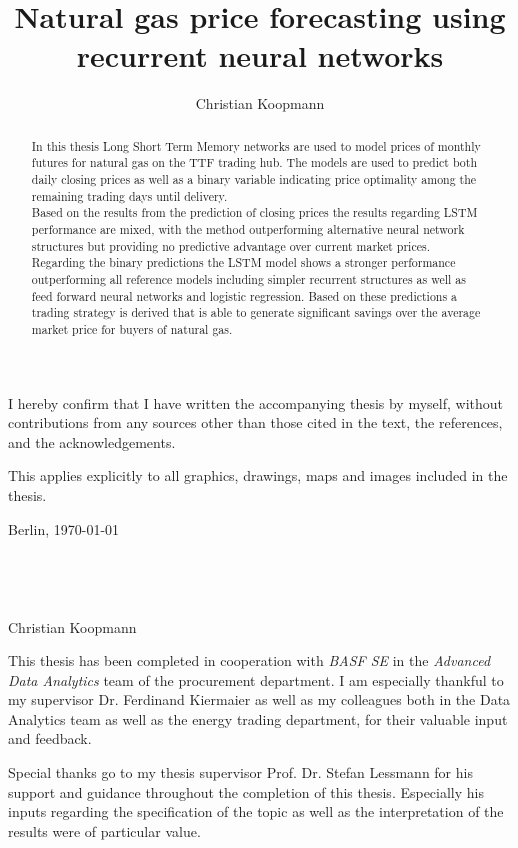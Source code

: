 \documentclass[12pt]{ociamthesis}
\title{\Large{Natural gas price forecasting using recurrent neural networks}}     %
\author{Christian Koopmann}             %
\begin{document}
\maketitle
\begin{romanpages}

\begin{originality}
I hereby confirm that I have written the accompanying thesis by myself, without
contributions from any sources other than those cited in the text, the references, and
the acknowledgements.

This applies explicitly to all graphics, drawings, maps and images included in the
thesis.

Berlin, \today
 \\
 \\
 \\
 \\
 \\
Christian Koopmann
\end{originality}
\newpage
\begin{acknowledgements}
This thesis has been completed in cooperation with \textit{BASF SE} in the \textit{Advanced Data Analytics} team of the procurement department. I am especially thankful to my supervisor Dr. Ferdinand Kiermaier as well as my colleagues both in the Data Analytics team as well as the energy trading department, for their valuable input and feedback.

Special thanks go to my thesis supervisor Prof. Dr. Stefan Lessmann for his support and guidance throughout the completion of this thesis. Especially his inputs regarding the specification of the topic as well as the interpretation of the results were of particular value. 
\end{acknowledgements}
\newpage
\begin{abstract}
In this thesis Long Short Term Memory networks are used to model prices of monthly futures for natural gas on the TTF trading hub. The models are used to predict both daily closing prices as well as a binary variable indicating price optimality among the remaining trading days until delivery.
 \\
Based on the results from the prediction of closing prices the results regarding LSTM performance are mixed, with the method outperforming alternative neural network structures but providing no predictive advantage over current market prices.
 \\
Regarding the binary predictions the LSTM model shows a stronger performance outperforming all reference models including simpler recurrent structures as well as feed forward neural networks and logistic regression. Based on these predictions a trading strategy is derived that is able to generate significant savings over the average market price for buyers of natural gas.
\end{abstract}
\tableofcontents
\listoffigures
\listoftables
\printglossaries
\end{romanpages}



\end{document}

